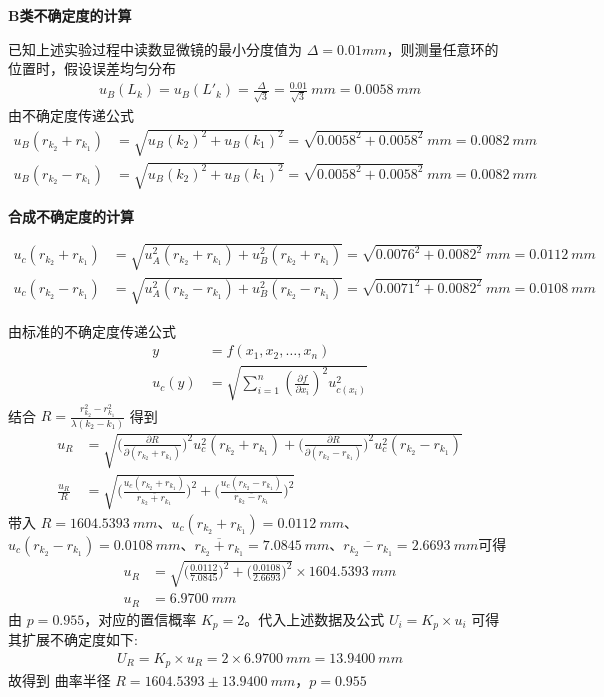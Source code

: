 \documentclass[UTF8]{ctexart}
\begin{document}
\textbf{B类不确定度的计算} 

已知上述实验过程中读数显微镜的最小分度值为 $ \Delta = 0.01mm$，则测量任意环的位置时，假设误差均匀分布
\begin{align*}
    u_B(L_k) = u_B(L'_k) = \frac{\Delta}{\sqrt{3}} = \frac{0.01}{\sqrt{3}} \ mm = 0.0058 \ mm
\end{align*}
由不确定度传递公式
\begin{align*}
    u_B(r_{k_2} + r_{k_1}) &= \sqrt{u_B(k_2)^2 + u_B(k_1)^2 } = \sqrt{0.0058^2 + 0.0058^2} \ mm = 0.0082 \ mm \\
     u_B(r_{k_2} - r_{k_1}) &= \sqrt{u_B(k_2)^2 + u_B(k_1)^2 } = \sqrt{0.0058^2 + 0.0058^2} \ mm = 0.0082 \ mm
\end{align*}


\textbf{合成不确定度的计算}

\begin{align*}
    u_c(r_{k_2} + r_{k_1}) &= \sqrt{u^2_A(r_{k_2} + r_{k_1}) + u^2_B(r_{k_2} + r_{k_1})} = \sqrt{ 0.0076^2 + 0.0082^2}  \ mm = 0.0112 \ mm \\
    u_c(r_{k_2} - r_{k_1}) &= \sqrt{u^2_A(r_{k_2} - r_{k_1}) + u^2_B(r_{k_2} - r_{k_1})} = \sqrt{ 0.0071^2 + 0.0082^2}  \ mm = 0.0108 \ mm
\end{align*}

由标准的不确定度传递公式 
\begin{align*}
    y &= f(x_1,x_2,\dots,x_n) \\
    u_c(y) &= \sqrt{\sum_{i=1}^{n}(\frac{\partial f}{\partial x_i})^2 u^2_{c(x_i)}}
\end{align*}
结合 $R = \frac{r^2_{k_2} - r^2_{k_1}}{\lambda (k_2 - k_1) }$
得到
\begin{align*}
    u_R &= \sqrt{ \Big(\frac{\partial R}{\partial (r_{k_2} + r_{k_1})} \Big)^2 u^2_c(r_{k_2} + r_{k_1})  + \Big(\frac{\partial R}{\partial (r_{k_2} - r_{k_1})} \Big)^2 u^2_c(r_{k_2} - r_{k_1})  } \\
    \frac{u_R}{R} &=  \sqrt{  \Big( \frac{u_c(r_{k_2} + r_{k_1})}{\overline{r_{k_2} + r_{k_1}}}  \Big)^2 + \Big( \frac{u_c(r_{k_2} - r_{k_1})}{\overline{r_{k_2} - r_{k_1}}}  \Big)^2  }
\end{align*}
带入 $R = 1604.5393 \ mm$、$ u_c(r_{k_2} + r_{k_1}) = 0.0112 \ mm$、$ u_c(r_{k_2} - r_{k_1}) = 0.0108 \ mm$、$\overline{r_{k_2} + r_{k_1}} = 7.0845 \ mm$、$\overline{r_{k_2} - r_{k_1}} = 2.6693 \ mm$可得
\begin{align*}
    u_R &= \sqrt{  \Big( \frac{0.0112}{7.0845}  \Big)^2 + \Big( \frac{0.0108}{2.6693} \Big)^2  } \times 1604.5393 \ mm \\
    u_R &= 6.9700 \ mm
\end{align*}
由 $p=0.955$，对应的置信概率 $K_p=2$。代入上述数据及公式 $U_i = K_p \times u_i$ 可得其扩展不确定度如下:
\begin{align*}
    U_R = K_p \times u_R = 2 \times 6.9700 \ mm = 13.9400 \ mm 
\end{align*}
故得到 曲率半径 $R = 1604.5393 \pm 13.9400 \ mm $，$p = 0.955$
\end{document}
